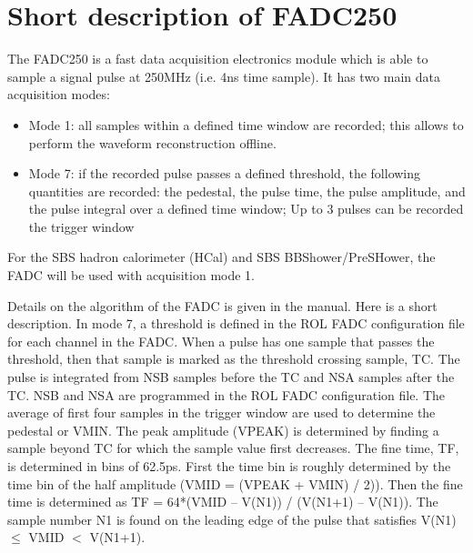 \documentclass[11pt]{article}
\begin{document}
\section{Short description of FADC250}
The FADC250 is a fast data acquisition electronics module which is able to sample a signal pulse at 250MHz (i.e. 4ns time sample).
It has two main data acquisition modes:
%
\begin{itemize}
	\item{Mode 1: all samples within a defined time window are recorded; this allows to perform the waveform reconstruction offline.}
	\item{Mode 7: if the recorded pulse passes a defined threshold, the following quantities are recorded: the pedestal, the pulse time, the pulse amplitude, and the pulse integral over a defined time window; Up to 3 pulses can be recorded the trigger window}
\end{itemize}
%
For the SBS hadron calorimeter (HCal) and SBS BBShower/PreSHower, the FADC will be used with acquisition mode 1.

Details on the algorithm of the FADC is given in the manual. Here is a short description.
In mode 7, a threshold is defined in the ROL FADC  configuration file for each channel in the FADC. When a pulse has one sample that passes the threshold, then that sample is marked
as the threshold crossing sample, TC.  The pulse is integrated from NSB samples before the TC and NSA samples after the TC. NSB and NSA are programmed in the ROL FADC configuration file.
The average of first four samples in the trigger window are used to determine the pedestal or VMIN.
The peak amplitude (VPEAK) is determined by finding a sample beyond TC for which the sample value first decreases.
The fine time, TF,  is determined in bins of 62.5ps. First the time bin is roughly determined by the time bin of the half amplitude (VMID = (VPEAK + VMIN) / 2)).
Then the fine time is determined as TF = 64*(VMID – V(N1)) / (V(N1+1) – V(N1)). The sample number N1 is found on the leading edge of the pulse that satisfies
V(N1) $\leq$ VMID $<$ V(N1+1).
\end{document}
